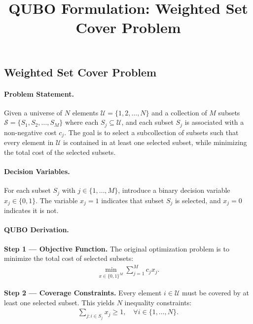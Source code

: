\documentclass[12pt]{article}
\title{QUBO Formulation: Weighted Set Cover Problem}
\date{}
\begin{document}
\maketitle

\subsection*{Weighted Set Cover Problem}

\paragraph{Problem Statement.}
Given a universe of $N$ elements $\mathcal{U} = \{1, 2, \dots, N\}$ and a collection of $M$ subsets $\mathcal{S} = \{S_1, S_2, \dots, S_M\}$ where each $S_j \subseteq \mathcal{U}$, and each subset $S_j$ is associated with a non-negative cost $c_j$. The goal is to select a subcollection of subsets such that every element in $\mathcal{U}$ is contained in at least one selected subset, while minimizing the total cost of the selected subsets.

\paragraph{Decision Variables.}
For each subset $S_j$ with $j \in \{1, \dots, M\}$, introduce a binary decision variable $x_j \in \{0, 1\}$. The variable $x_j = 1$ indicates that subset $S_j$ is selected, and $x_j = 0$ indicates it is not.

\paragraph{QUBO Derivation.}
\textbf{Step 1 --- Objective Function.} The original optimization problem is to minimize the total cost of selected subsets:
\begin{align}
\min_{x \in \{0,1\}^M} \sum_{j=1}^M c_j x_j.
\end{align}

\textbf{Step 2 --- Coverage Constraints.} Every element $i \in \mathcal{U}$ must be covered by at least one selected subset. This yields $N$ inequality constraints:
\begin{align}
\sum_{j: i \in S_j} x_j \ge 1, \quad \forall i \in \{1, \dots, N\}.
\end{align}
\end{document}
